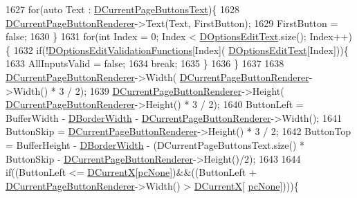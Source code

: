 \begin{DoxyCode}
1627     \textcolor{keywordflow}{for}(\textcolor{keyword}{auto} Text : \hyperlink{classCApplicationData_af04b7f5f8ba4e5c99c0a3530055fc15d}{DCurrentPageButtonsText})\{
1628         \hyperlink{classCApplicationData_abfe1743f2634b069ccc811db4a8733a8}{DCurrentPageButtonRenderer}->Text(Text, FirstButton);
1629         FirstButton = \textcolor{keyword}{false};
1630     \}
1631     \textcolor{keywordflow}{for}(\textcolor{keywordtype}{int} Index = 0; Index < \hyperlink{classCApplicationData_a7044dc34cbd9d6776e8ef79eb12b5ce4}{DOptionsEditText}.size(); Index++)\{
1632         \textcolor{keywordflow}{if}(!\hyperlink{classCApplicationData_ab76fa444142de66fdb058f390e01112c}{DOptionsEditValidationFunctions}[Index](
      \hyperlink{classCApplicationData_a7044dc34cbd9d6776e8ef79eb12b5ce4}{DOptionsEditText}[Index]))\{
1633             AllInputsValid = \textcolor{keyword}{false};
1634             \textcolor{keywordflow}{break};
1635         \}
1636     \}
1637     
1638     \hyperlink{classCApplicationData_abfe1743f2634b069ccc811db4a8733a8}{DCurrentPageButtonRenderer}->Width(
      \hyperlink{classCApplicationData_abfe1743f2634b069ccc811db4a8733a8}{DCurrentPageButtonRenderer}->Width() * 3 / 2);
1639     \hyperlink{classCApplicationData_abfe1743f2634b069ccc811db4a8733a8}{DCurrentPageButtonRenderer}->Height(
      \hyperlink{classCApplicationData_abfe1743f2634b069ccc811db4a8733a8}{DCurrentPageButtonRenderer}->Height() * 3 / 2);                            
1640     ButtonLeft = BufferWidth - \hyperlink{classCApplicationData_a566b69c72fa982c6ecf8e47dc21df489}{DBorderWidth} - 
      \hyperlink{classCApplicationData_abfe1743f2634b069ccc811db4a8733a8}{DCurrentPageButtonRenderer}->Width();
1641     ButtonSkip = \hyperlink{classCApplicationData_abfe1743f2634b069ccc811db4a8733a8}{DCurrentPageButtonRenderer}->Height() * 3 / 2;
1642     ButtonTop = BufferHeight - \hyperlink{classCApplicationData_a566b69c72fa982c6ecf8e47dc21df489}{DBorderWidth} - (DCurrentPageButtonsText.size() * ButtonSkip - 
      \hyperlink{classCApplicationData_abfe1743f2634b069ccc811db4a8733a8}{DCurrentPageButtonRenderer}->Height()/2);
1643     
1644     \textcolor{keywordflow}{if}((ButtonLeft <= \hyperlink{classCApplicationData_a1dc7ee482a39f7978c71365ac540f97a}{DCurrentX}[\hyperlink{GameDataTypes_8h_aafb0ca75933357ff28a6d7efbdd7602fa88767aa8e02c7b3192bbab4127b3d729}{pcNone}])&&((ButtonLeft + 
      \hyperlink{classCApplicationData_abfe1743f2634b069ccc811db4a8733a8}{DCurrentPageButtonRenderer}->Width() > \hyperlink{classCApplicationData_a1dc7ee482a39f7978c71365ac540f97a}{DCurrentX}[
      \hyperlink{GameDataTypes_8h_aafb0ca75933357ff28a6d7efbdd7602fa88767aa8e02c7b3192bbab4127b3d729}{pcNone}])))\{

\end{DoxyCode}
